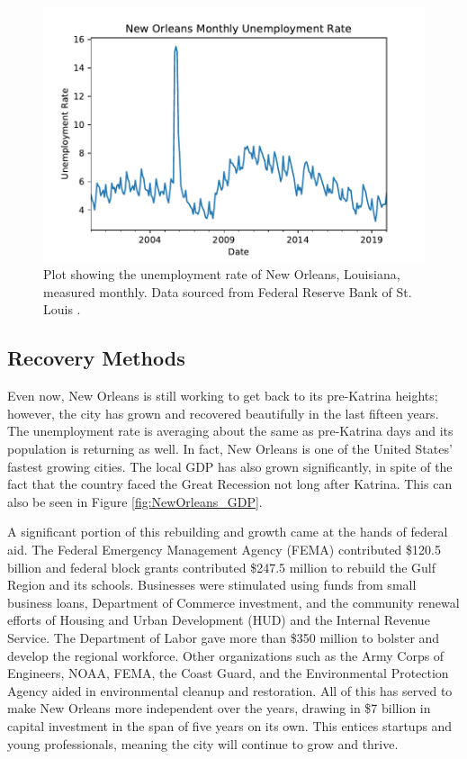 \documentclass[%
 reprint,
 amsmath,amssymb,
 aps,
]{revtex4-1}
\begin{document}
\begin{figure}
	\includegraphics[scale=0.6]{plot_NewOrleans_unemployment.pdf}
	\centering
	\caption{Plot showing the unemployment rate of New Orleans, Louisiana, measured monthly. Data sourced from Federal Reserve Bank of St. Louis \cite{NOLA_unemployment_data}.}
	\label{fig:NewOrleans_unemployment}
\end{figure}

\subsection{\label{sec:level2} Recovery Methods}

Even now, New Orleans is still working to get back to its pre-Katrina heights; however, the city has grown and recovered beautifully in the last fifteen years. The unemployment rate is averaging about the same as pre-Katrina days and its population is returning as well. In fact, New Orleans is one of the United States' fastest growing cities. The local GDP has also grown significantly, in spite of the fact that the country faced the Great Recession not long after Katrina. This can also be seen in Figure \ref{fig:NewOrleans_GDP}.

A significant portion of this rebuilding and growth came at the hands of federal aid. The Federal Emergency Management Agency (FEMA) contributed \$120.5 billion and federal block grants contributed \$247.5 million to rebuild the Gulf Region and its schools. Businesses were stimulated using funds from small business loans, Department of Commerce investment, and the community renewal efforts of Housing and Urban Development (HUD) and the Internal Revenue Service. The Department of Labor gave more than \$350 million to bolster and develop the regional workforce. Other organizations such as the Army Corps of Engineers, NOAA, FEMA, the Coast Guard, and the Environmental Protection Agency aided in environmental cleanup and restoration. All of this has served to make New Orleans more independent over the years, drawing in \$7 billion in capital investment in the span of five years on its own. This entices startups and young professionals, meaning the city will continue to grow and thrive. \cite{meys_franzi_2018}
\end{document}
